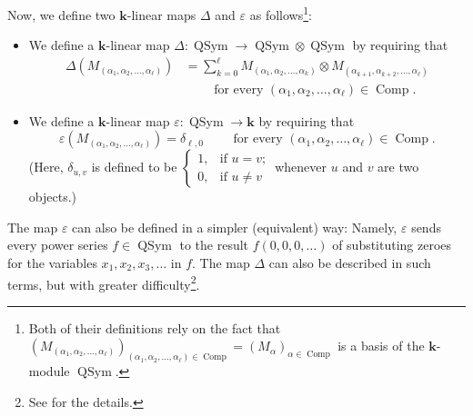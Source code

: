 \documentclass[numbers=enddot,12pt,final,onecolumn,notitlepage,abstracton]{scrartcl}
\theoremstyle{definition}
\let\sumnonlimits\sum
\renewcommand{\sum}{\sumnonlimits\limits}
\newcommand{\kk}{{\mathbf{k}}}
\newcommand{\Comp}{{\operatorname{Comp}}}
\newcommand{\QSym}{{\operatorname{QSym}}}
\begin{document}
Now, we define two $\kk$-linear maps $\Delta$ and $\varepsilon$
as follows\footnote{Both of their definitions rely on the fact
that
$\left( M_{\left(\alpha_1, \alpha_2, \ldots, \alpha_\ell\right)} \right)_{
   \left(\alpha_1, \alpha_2, \ldots, \alpha_\ell\right) \in \Comp}
= \left( M_\alpha \right)_{\alpha \in \Comp}$
is a basis of the $\kk$-module $\QSym$.}:
\begin{itemize}
\item
We define a $\kk$-linear map $\Delta : \QSym \to \QSym \otimes \QSym$
by requiring that
\begin{align}
\label{eq.coproduct.M}
\Delta \left( M_{\left( \alpha_1, \alpha_2, \ldots, \alpha_\ell
\right) }\right)
&= \sum_{k=0}^{\ell} M_{\left( \alpha_1, \alpha_2, \ldots,
\alpha_k \right) } \otimes M_{\left( \alpha_{k+1}, \alpha_{k+2},
\ldots, \alpha_\ell \right) } \\
& \qquad \text{ for every } \left(\alpha_1, \alpha_2,
\ldots, \alpha_\ell\right) \in \Comp . \nonumber
\end{align}
\item We define a $\kk$-linear map
$\varepsilon : \QSym \to \kk$ by requiring that
\[
\varepsilon\left(  M_{\left(
\alpha_1, \alpha_2, \ldots, \alpha_\ell \right) }\right)
= \delta_{\ell, 0}
\qquad \text{ for every } \left(\alpha_1, \alpha_2,
\ldots, \alpha_\ell\right) \in \Comp .
\]
(Here, $\delta_{u,v}$ is defined to be
$\begin{cases}
1, & \text{if }u = v \text{;}\\
0, & \text{if }u \neq v
\end{cases}$
whenever $u$ and $v$ are two objects.)
\end{itemize}

The map $\varepsilon$ can also be defined in a simpler
(equivalent) way: Namely, $\varepsilon$ sends every power series
$f \in \QSym$
to the result $f\left(0,0,0,\ldots\right)$ of substituting zeroes
for the variables $x_1, x_2, x_3, \ldots$ in $f$. The map $\Delta$
can also be described in such terms, but with greater
difficulty\footnote{See \cite[(5.1.7)]{Reiner} for the details.}.
\end{document}
